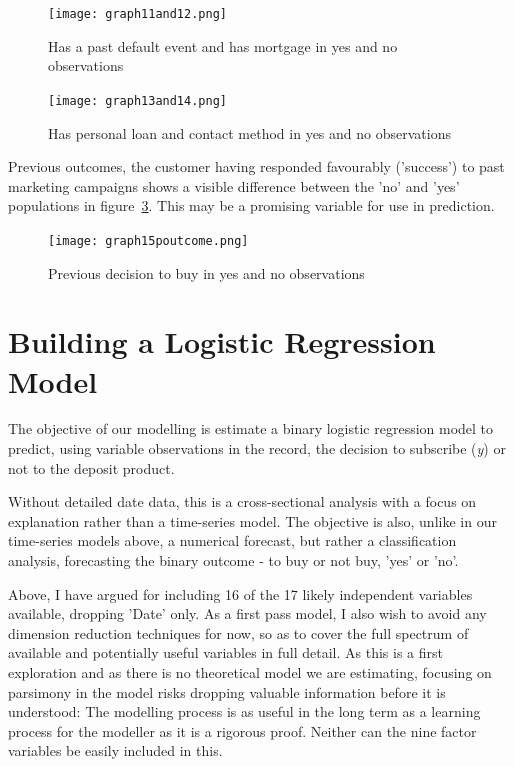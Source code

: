 \documentclass[9pt,technote]{IEEEtran}
\begin{document}
\begin{figure}[htbp]
\centerline{\texttt{[image: graph11and12.png]}}
\caption{Has a past default event and has mortgage in yes and no observations}
\label{fig:graph11and12}
\end{figure}

\begin{figure}[htbp]
\centerline{\texttt{[image: graph13and14.png]}}
\caption{Has personal loan and contact method in yes and no observations}
\label{fig:graph13and14}
\end{figure}

Previous outcomes, the customer having responded favourably ('success') to past marketing campaigns shows a visible difference between the 'no' and 'yes' populations in figure~\ref{fig:graph15poutcome}.  This may be a promising variable for use in prediction.  

\begin{figure}[htbp]
\centerline{\texttt{[image: graph15poutcome.png]}}
\caption{Previous decision to buy in yes and no observations}
\label{fig:graph15poutcome}
\end{figure}

\section{Building a Logistic Regression Model}

The objective of our modelling is estimate a binary logistic regression model to predict, using variable observations in the record, the decision to subscribe (\textit{y}) or not to the deposit product.  

Without detailed date data, this is a cross-sectional analysis with a focus on explanation rather than a time-series model.  The objective is also, unlike in our time-series models above, a numerical forecast, but rather a classification analysis, forecasting the binary outcome - to buy or not buy, 'yes' or 'no'.  

Above, I have argued for including 16 of the 17 likely independent variables available, dropping 'Date' only.  As a first pass model, I also wish to avoid any dimension reduction techniques for now, so as to cover the full spectrum of available and potentially useful variables in full detail.  As this is a first exploration and as there is no theoretical model we are estimating, focusing on parsimony in the model risks dropping valuable information before it is understood: The modelling process is as useful in the long term as a learning process for the modeller as it is a rigorous proof.  Neither can the nine factor variables be easily included in this.  
\end{document}
